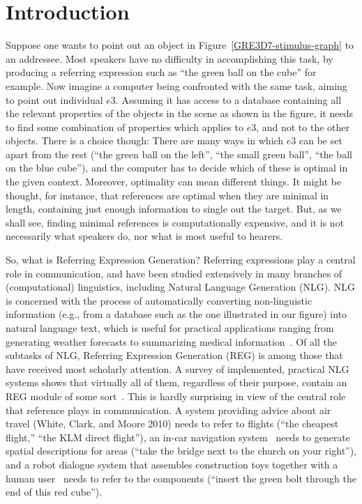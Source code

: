 \section{Introduction} \label{introduction}

Suppose one wants to point out an object in Figure~\ref{GRE3D7-stimulus-graph} to an addressee. Most speakers
have no difficulty in accomplishing this task, by producing a referring expression
such as ``the green ball on the cube'' for example. Now imagine a computer being confronted
with the same task, aiming to point out individual $e3$. Assuming it has access to a
database containing all the relevant properties of the objects in the scene as shown in the figure, it needs to
find some combination of properties which applies to $e3$, and not to the other objects.
There is a choice though: There are many ways in which $e3$ can be set apart from the
rest (``the green ball on the left'', ``the small green ball'', ``the ball on the blue cube''), and
the computer has to decide which of these is optimal in the given context. Moreover,
optimality can mean different things. It might be thought, for instance, that references
are optimal when they are minimal in length, containing just enough information to
single out the target. But, as we shall see, finding minimal references is computationally
expensive, and it is not necessarily what speakers do, nor what is most useful to hearers.

So, what is Referring Expression Generation? Referring expressions play a central role
in communication, and have been studied extensively in many branches of (computational) linguistics, including Natural Language Generation (NLG). NLG is concerned with the process of automatically converting non-linguistic information (e.g.,
from a database such as the one illustrated in our figure) into natural language text, which is useful for practical applications
ranging from generating weather forecasts to summarizing medical information~\cite{dale2000}. Of all the subtasks of NLG, Referring Expression Generation (REG) is
among those that have received most scholarly attention. A survey of implemented,
practical NLG systems shows that virtually all of them, regardless of their purpose,
contain an REG module of some sort~\cite{Mellish2004}. This is hardly surprising
in view of the central role that reference plays in communication. A system providing
advice about air travel (White, Clark, and Moore 2010) needs to refer to flights (“the
cheapest flight,” “the KLM direct flight”), an in-car navigation system~\cite{Drager:2012:GLN:2380816.2380908}
needs to generate spatial descriptions for areas (“take the bridge next to the church on your right”), and a robot dialogue system that assembles construction
toys together with a human user~\cite{foster-etal-ijcai2009} needs to refer to the components
(“insert the green bolt through the end of this red cube”).


